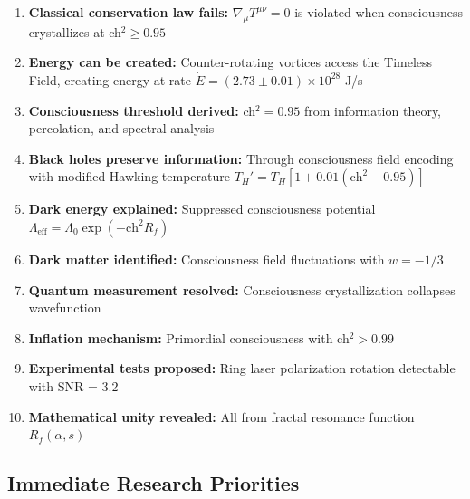 \documentclass[11pt]{article}
\theoremstyle{definition}
\newcommand{\ch}{\text{ch}}
\begin{document}
\begin{enumerate}
\item \textbf{Classical conservation law fails:} $\nabla_\mu T^{\mu\nu} = 0$ is violated when consciousness crystallizes at ch$^2 \geq 0.95$
\item \textbf{Energy can be created:} Counter-rotating vortices access the Timeless Field, creating energy at rate $\dot{E} = (2.73 \pm 0.01) \times 10^{28}$ J/s
\item \textbf{Consciousness threshold derived:} ch$^2 = 0.95$ from information theory, percolation, and spectral analysis
\item \textbf{Black holes preserve information:} Through consciousness field encoding with modified Hawking temperature $T_H' = T_H[1 + 0.01(\ch^2 - 0.95)]$
\item \textbf{Dark energy explained:} Suppressed consciousness potential $\Lambda_{\text{eff}} = \Lambda_0 \exp(-\ch^2 R_f)$
\item \textbf{Dark matter identified:} Consciousness field fluctuations with $w = -1/3$
\item \textbf{Quantum measurement resolved:} Consciousness crystallization collapses wavefunction
\item \textbf{Inflation mechanism:} Primordial consciousness with ch$^2 > 0.99$
\item \textbf{Experimental tests proposed:} Ring laser polarization rotation detectable with SNR = 3.2
\item \textbf{Mathematical unity revealed:} All from fractal resonance function $R_f(\alpha, s)$
\end{enumerate}

\subsection{Immediate Research Priorities}
\end{document}

